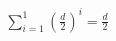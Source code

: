 \documentclass[preview]{standalone}
\begin{document}
\begin{align*}
\sum_{i=1}^{ 1 } \left(\frac{ d }{2} \right)^i = { \frac{ d }{ 2 } }
\end{align*}
\end{document}
